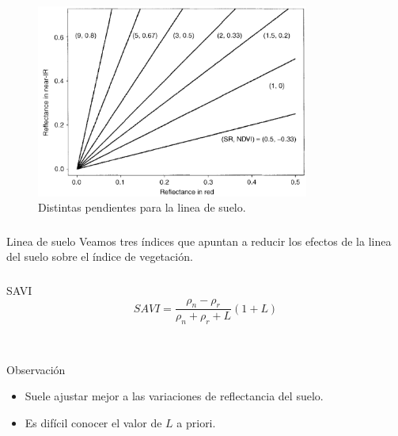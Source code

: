 \documentclass[handout]{beamer}
\begin{document}
\begin{frame}
    \frametitle{\subsecname}
    \begin{figure}
    \begin{center}
        \includegraphics[width=0.8\textwidth]{imagenes/soiline.png}
    \end{center}
        \caption{Distintas pendientes para la linea de
        suelo.}
    \end{figure}
\end{frame}

\begin{frame}
    \frametitle{\subsecname}
    \begin{block}{Linea de suelo}
        Veamos tres índices que apuntan a reducir los efectos de la linea del
        suelo sobre el índice de vegetación.
    \end{block}
\end{frame}

\begin{frame}
    \frametitle{\subsecname}
    \begin{block}{SAVI}
        \begin{equation}
            SAVI = \frac{\rho_n-\rho_r}{\rho_n+\rho_r+L}(1+L)
        \end{equation}
    \end{block}\pause\
    \begin{block}{Observación}
        \begin{itemize}[<+->]
            \item Suele ajustar mejor a las variaciones de reflectancia del
                suelo.
            \item Es difícil conocer el valor de $L$ a priori.
        \end{itemize}
    \end{block}
\end{frame}
\end{document}
